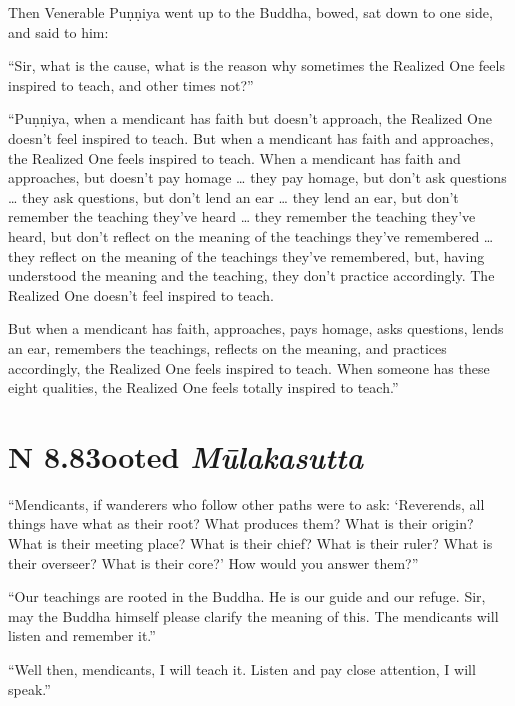 \documentclass[12pt,openany]{book}%
\newcommand*{\suttatitleacronym}[1]{\smaller[2]{#1}\vspace*{.3em}}
\newcommand*{\suttatitletranslation}[1]{\linebreak{#1}}
\newcommand*{\suttatitleroot}[1]{\linebreak\smaller[2]\itshape{#1}}
\newcommand*{\tocacronym}[1]{\hspace*{-3.3em}{#1}\quad}
\newcommand*{\toctranslation}[1]{#1}
\newcommand*{\tocroot}[1]{(\textit{#1})}
\begin{document}
Then Venerable \textsanskrit{Puṇṇiya} went up to the Buddha, bowed, sat down to one side, and said to him: 

“Sir, what is the cause, what is the reason why sometimes the Realized One feels inspired to teach, and other times not?” 

“\textsanskrit{Puṇṇiya}, when a mendicant has faith but doesn’t approach, the Realized One doesn’t feel inspired to teach. But when a mendicant has faith and approaches, the Realized One feels inspired to teach. When a mendicant has faith and approaches, but doesn’t pay homage … they pay homage, but don’t ask questions … they ask questions, but don’t lend an ear … they lend an ear, but don’t remember the teaching they’ve heard … they remember the teaching they’ve heard, but don’t reflect on the meaning of the teachings they’ve remembered … they reflect on the meaning of the teachings they’ve remembered, but, having understood the meaning and the teaching, they don’t practice accordingly. The Realized One doesn’t feel inspired to teach. 

But when a mendicant has faith, approaches, pays homage, asks questions, lends an ear, remembers the teachings, reflects on the meaning, and practices accordingly, the Realized One feels inspired to teach. When someone has these eight qualities, the Realized One feels totally inspired to teach.” 

%
\section*{{\suttatitleacronym AN 8.83}{\suttatitletranslation Rooted }{\suttatitleroot Mūlakasutta}}
\addcontentsline{toc}{section}{\tocacronym{AN 8.83} \toctranslation{Rooted } \tocroot{Mūlakasutta}}

“Mendicants, if wanderers who follow other paths were to ask: ‘Reverends, all things have what as their root? What produces them? What is their origin? What is their meeting place? What is their chief? What is their ruler? What is their overseer? What is their core?’ How would you answer them?” 

“Our teachings are rooted in the Buddha. He is our guide and our refuge. Sir, may the Buddha himself please clarify the meaning of this. The mendicants will listen and remember it.” 

“Well then, mendicants, I will teach it. Listen and pay close attention, I will speak.” 
\end{document}
